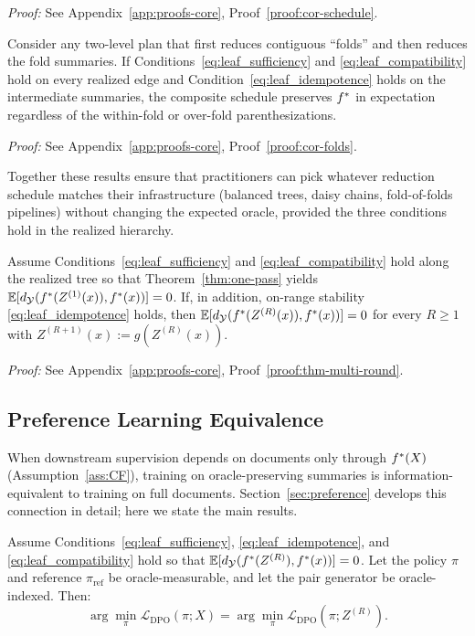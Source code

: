 \noindent\textit{Proof:} See Appendix~\ref{app:proofs-core}, Proof~\ref{proof:cor-schedule}.

\begin{corollary}\label{cor:folds}
Consider any two-level plan that first reduces contiguous ``folds'' and then reduces the fold summaries. If Conditions~\eqref{eq:leaf_sufficiency} and \eqref{eq:leaf_compatibility} hold on every realized edge and Condition~\eqref{eq:leaf_idempotence} holds on the intermediate summaries, the composite schedule preserves $f^{\ast}$ in expectation regardless of the within-fold or over-fold parenthesizations.
\end{corollary}

\noindent\textit{Proof:} See Appendix~\ref{app:proofs-core}, Proof~\ref{proof:cor-folds}.

Together these results ensure that practitioners can pick whatever reduction schedule matches their infrastructure (balanced trees, daisy chains, fold-of-folds pipelines) without changing the expected oracle, provided the three conditions hold in the realized hierarchy.

\begin{theorem}\label{thm:multi-round}
Assume Conditions~\eqref{eq:leaf_sufficiency} and \eqref{eq:leaf_compatibility} hold along the realized tree so that Theorem~\ref{thm:one-pass} yields $\mathbb{E}[d_{\mathcal{Y}}(f^{\ast}(Z^{(1)}(x)), f^{\ast}(x))] = 0$. If, in addition, on-range stability \eqref{eq:leaf_idempotence} holds, then $\mathbb{E}[d_{\mathcal{Y}}(f^{\ast}(Z^{(R)}(x)), f^{\ast}(x))] = 0$ for every $R \geq 1$ with $Z^{(R+1)}(x) := g(Z^{(R)}(x))$.
\end{theorem}

\noindent\textit{Proof:} See Appendix~\ref{app:proofs-core}, Proof~\ref{proof:thm-multi-round}.

\subsection{Preference Learning Equivalence}

When downstream supervision depends on documents only through $f^{\ast}(X)$ (Assumption~\ref{ass:CF}), training on oracle-preserving summaries is information-equivalent to training on full documents. Section~\ref{sec:preference} develops this connection in detail; here we state the main results.

\begin{theorem}\label{thm:dpo-equiv}
Assume Conditions~\eqref{eq:leaf_sufficiency}, \eqref{eq:leaf_idempotence}, and \eqref{eq:leaf_compatibility} hold so that $\mathbb{E}[d_{\mathcal{Y}}(f^{\ast}(Z^{(R)}), f^{\ast}(x))] = 0$. Let the policy $\pi$ and reference $\pi_{\mathrm{ref}}$ be oracle-measurable, and let the pair generator be oracle-indexed. Then:
\[
\arg\min_\pi \mathcal{L}_{\mathrm{DPO}}(\pi; X) = \arg\min_\pi \mathcal{L}_{\mathrm{DPO}}(\pi; Z^{(R)}).
\]
\end{theorem}

